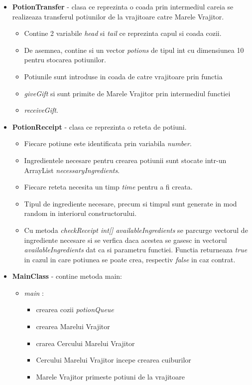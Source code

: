 \documentclass{article}
\begin{document}
\begin{itemize}
        \item \textbf{PotionTransfer} - clasa ce reprezinta o coada prin intermediul careia se realizeaza transferul potiunilor de la vrajitoare catre Marele Vrajitor.
            \begin{itemize}
            \item Contine 2 variabile \textit{head} si \textit{tail} ce reprezinta capul si coada cozii.
            \item De asemnea, contine si un vector \textit{potions} de tipul int cu dimensiunea 10 pentru stocarea potiunilor.
            \item Potiunile sunt introduse in coada de catre vrajitoare prin functia \item \textit{giveGift} si sunt primite de Marele Vrajitor prin intermediul functiei \item \textit{receiveGift}.
            
            \end{itemize}
        \item \textbf{PotionReceipt} - clasa ce reprezinta o reteta de potiuni.
        \begin{itemize}
            \item Fiecare potiune este identificata prin variabila \textit{number}.
            \item Ingredientele necesare pentru crearea potiunii sunt stocate intr-un ArrayList \textit{necessaryIngredients}.
            \item Fiecare reteta necesita un timp \textit{time} pentru a fi creata.
            \item Tipul de ingrediente necesare, precum si timpul sunt generate in mod random in interiorul constructorului.
            \item Cu metoda \textit{checkReceipt int[] availableIngredients} se parcurge vectorul de ingrediente necesare si se verfica daca acestea se gasesc in vectorul \textit{availableIngredients} dat ca si parametru functiei. Functia returneaza \textit{true} in cazul in care potiunea se poate crea, respectiv \textit{false} in caz contrat.
          \end{itemize}
        \item \textbf{MainClass} - contine metoda main:
            \begin{itemize}
                \item \textit{main} :
                \begin{itemize}
                    \item crearea cozii \textit{potionQueue}
                    \item crearea Marelui Vrajitor
                    \item crarea Cercului Marelui Vrajitor
                    \item Cercului Marelui Vrajitor incepe crearea cuiburilor
                    \item Marele Vrajitor primeste potiuni de la vrajitoare
                \end{itemize}
            \end{itemize}
            

\end{itemize}
\end{document}
